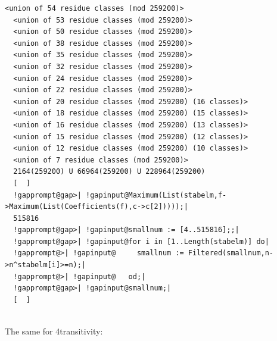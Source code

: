 \documentclass[a4paper,11pt]{report}
\begin{document}
{{\begin{Verbatim}[commandchars=!@|,fontsize=\small,frame=single,label=Example]
  <union of 54 residue classes (mod 259200)>
  <union of 53 residue classes (mod 259200)>
  <union of 50 residue classes (mod 259200)>
  <union of 38 residue classes (mod 259200)>
  <union of 35 residue classes (mod 259200)>
  <union of 32 residue classes (mod 259200)>
  <union of 24 residue classes (mod 259200)>
  <union of 22 residue classes (mod 259200)>
  <union of 20 residue classes (mod 259200) (16 classes)>
  <union of 18 residue classes (mod 259200) (15 classes)>
  <union of 16 residue classes (mod 259200) (13 classes)>
  <union of 15 residue classes (mod 259200) (12 classes)>
  <union of 12 residue classes (mod 259200) (10 classes)>
  <union of 7 residue classes (mod 259200)>
  2164(259200) U 66964(259200) U 228964(259200)
  [  ]
  !gapprompt@gap>| !gapinput@Maximum(List(stabelm,f->Maximum(List(Coefficients(f),c->c[2]))));|
  515816
  !gapprompt@gap>| !gapinput@smallnum := [4..515816];;|
  !gapprompt@gap>| !gapinput@for i in [1..Length(stabelm)] do|
  !gapprompt@>| !gapinput@     smallnum := Filtered(smallnum,n->n^stabelm[i]>=n);|
  !gapprompt@>| !gapinput@   od;|
  !gapprompt@gap>| !gapinput@smallnum;|
  [  ]
  
\end{Verbatim}
 The same for 4\texttt{}transitivity: 
\begin{Verbatim}[commandchars=!@|,fontsize=\small,frame=single,label=Example]
  

\end{Verbatim}}}
\end{document}
